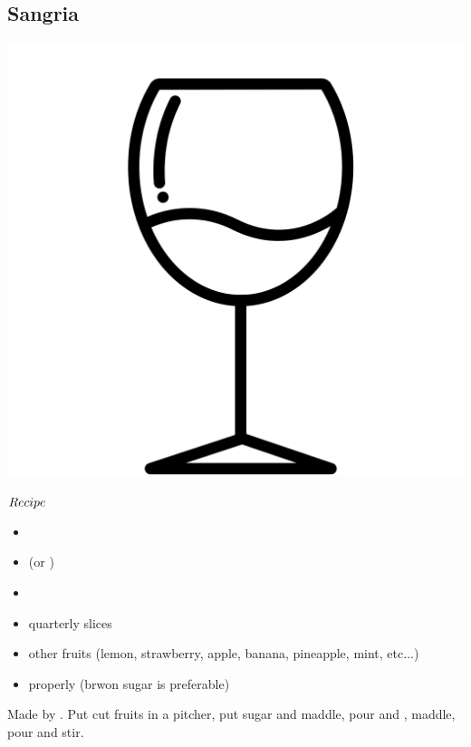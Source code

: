 \subsection{Sangria}
\vspace{-7.6mm}
\hspace{26mm}
\includegraphics[scale=.03]{cocktail_glass_sour.png}
\vspace{2.5mm}
\begin{itembox}[l]{\boldmath $Recipe$}
\begin{itemize}
\setlength{\parskip}{0cm}
\setlength{\itemsep}{0cm}
\item \rw 
\item \brandy (or \rum) 
\item \oj 
\item \orange quarterly slices
\item other fruits (lemon, strawberry, apple, banana, pineapple, mint, etc$\ldots$)
\item \sugar properly (brwon sugar is preferable)
\end{itemize}
\vspace{-4mm}
Made by \build
\hspace{-1mm}. Put cut fruits in a pitcher, put sugar and maddle, pour \oj and \brandy
\hspace{-1mm}, maddle, pour \rw and stir.
\end{itembox}
